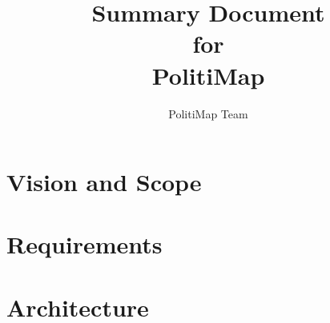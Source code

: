 \documentclass[12pt,oneside,letterpaper]{article}
\title{Summary Document\\\large for\\\Large PolitiMap}
\author{PolitiMap Team}
\begin{document}
\thispagestyle{empty}\maketitle
\tableofcontents

\section{Vision and Scope}


\section{Requirements}


\section{Architecture}

\end{document}
